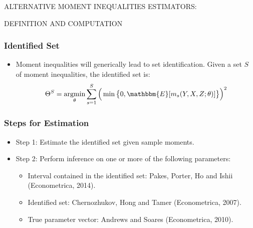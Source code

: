 
\begin{frame}
\centerline{ALTERNATIVE MOMENT INEQUALITIES ESTIMATORS:} %
\centerline{DEFINITION AND COMPUTATION}
\end{frame}


\begin{frame}
\frametitle{Identified Set}

\begin{itemize}
\item Moment inequalities will generically lead to set identification. Given
a set $S$ of moment inequalities, the identified set is:  
\begin{equation*}
\Theta^{S}=\operatornamewithlimits{argmin}_{\theta}\sum_{s=1}^{S}\Big(\min%
\big\{0,\mathbbm{E}[m_{s}(Y,X,Z;\theta)]\big\}\Big)^{2}
\end{equation*}
\begin{figure}[h!]
\begin{center}
   
\end{center}
\end{figure}
\end{itemize}
\end{frame}


\begin{frame}
\frametitle{Steps for Estimation}

\begin{itemize}
\item Step 1: Estimate the identified set given sample moments. 

\item Step 2: Perform inference on one or more of the following parameters: 

\begin{itemize}
\item Interval contained in the identified set: Pakes, Porter, Ho and Ishii
(Econometrica, 2014). 

\item Identified set: Chernozhukov, Hong and Tamer (Econometrica, 2007). 

\item True parameter vector: Andrews and Soares (Econometrica, 2010). 
\end{itemize}
\end{itemize}
\end{frame}

